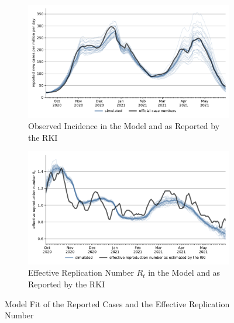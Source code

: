 \begin{figure}[ht]   %
    \centering
    \begin{subfigure}[b]{0.425\textwidth}
        \centering
        \includegraphics[width=\textwidth]{figures/results/figures/scenario_comparisons/combined_fit/full_new_known_case_with_single_runs}
        \caption{Observed Incidence in the Model and as Reported by the RKI}
        \label{fig:aggregated_fit2}
    \end{subfigure}
    \hfill
    \begin{subfigure}[b]{0.425\textwidth}
        \includegraphics[width=\textwidth]{figures/results/figures/scenario_comparisons/combined_fit/full_r_effective_with_single_runs}
        \caption{Effective Replication Number $R_t$ in the Model and as Reported by the RKI}
        \label{fig:fit_r_effective}
    \end{subfigure}

    \caption{Model Fit of the Reported Cases and the Effective Replication Number}
    \label{fig:incidence_and_r_effective}


\end{figure}
